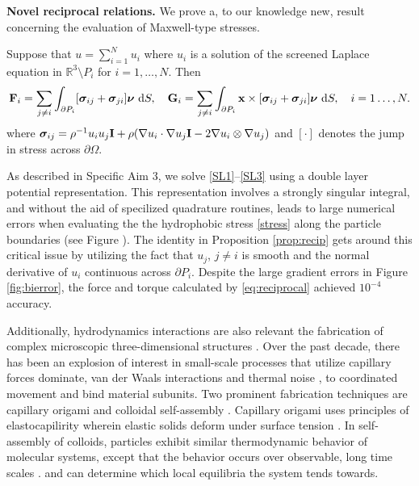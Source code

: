 \textbf{Novel reciprocal relations.}
We prove a, to our knowledge new, result concerning the evaluation of Maxwell-type stresses. 
\begin{proposition}
  \label{prop:recip}
  Suppose that $u = \sum_{i=1}^N u_i$ where $u_i$ is a solution of the screened Laplace equation
  in $\mathbb{R}^3 \setminus P_i$ for $i=1,\dots, N.$ Then 
  \begin{equation}
    \label{eq:reciprocal}
{\bf F}_i = \sum_{j \neq i} \int_{\partial P_i}[\boldsymbol{\sigma}_{ij} + \boldsymbol{\sigma}_{ji}]\boldsymbol{\nu}\,\dif S,\quad
{\bf G}_i = \sum_{j \neq i} \int_{\partial P_i} {\bf x} \times [\boldsymbol{\sigma}_{ij} + \boldsymbol{\sigma}_{ji}]\boldsymbol{\nu}\,\dif S, \quad i = 1\dots, N.
\end{equation}
where $\boldsymbol{\sigma}_{ij} = \rho^{-1} u_iu_j {\bf I} + \rho(\nabla u_i \cdot \nabla u_j {\bf I} - 2 \nabla u_i \otimes \nabla u_j)$ and
$[\cdot]$ denotes the jump in stress across $\partial \Omega.$ 
\end{proposition}
As described in Specific Aim 3, we solve \eqref{SL1}--\eqref{SL3}  using a double layer potential representation.
This representation involves a strongly singular integral, and without the aid of specilized
quadrature routines, leads to large numerical errors when evaluating the the hydrophobic stress \eqref{stress} along the particle boundaries (see Figure \cite{fig:bierror}).
The identity in Proposition \ref{prop:recip} gets around this critical issue by utilizing the fact that $u_j$, $j\neq i$ is smooth and the normal derivative
of  $u_i$ continuous across $\partial P_i$. Despite the large gradient errors in Figure \ref{fig:bierror}, the force and torque
calculated by \eqref{eq:reciprocal} achieved $10^{-4}$ accuracy.

Additionally, hydrodynamics interactions are also relevant the fabrication of complex microscopic three-dimensional structures \cite{Cho2010}.
Over the past decade, there has been an explosion of interest in small-scale processes that utilize capillary forces dominate,  van der Waals interactions and thermal noise  \cite{Zhang2017}, to coordinated movement and bind  material subunits. Two prominent fabrication techniques are capillary origami 
\cite{Pandey2011,Leong2007,Reynolds2019} and colloidal self-assembly \cite{Dasgupta2017,Siontorou2017}. Capillary origami uses principles of elastocapilirity wherein elastic solids deform under surface tension \cite{Bico2018,VanHonschoten2010}. In self-assembly of colloids, 
particles exhibit similar thermodynamic behavior of molecular systems, except that the behavior occurs over observable, long time scales \cite{Zhang2017}. 
and can determine which local equilibria the system tends towards.


